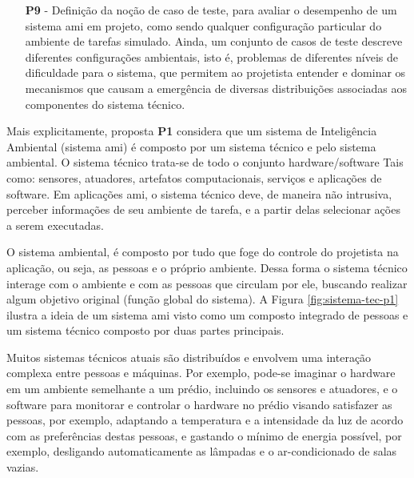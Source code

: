 \begin{itemize}
    \item[\textbf{P9} -] Definição da noção de caso de teste, para avaliar o desempenho de um sistema \acrshort{ami} em projeto, como sendo qualquer configuração particular do ambiente de tarefas simulado. Ainda, um conjunto de casos de teste descreve diferentes configurações ambientais, isto é, problemas de diferentes níveis de dificuldade para o sistema, que permitem ao projetista entender e dominar os mecanismos que causam a emergência de diversas distribuições associadas aos componentes do sistema técnico.
    
\end{itemize}

    Mais explicitamente, proposta \textbf{P1} considera que um sistema de Inteligência Ambiental (sistema \acrshort{ami}) é composto por um sistema técnico e pelo sistema ambiental. O sistema técnico trata-se de todo o conjunto hardware/software Tais como: sensores, atuadores, artefatos computacionais, serviços e aplicações de software. Em aplicações \acrshort{ami}, o sistema técnico deve, de maneira não intrusiva, perceber informações de seu ambiente de tarefa, e a partir delas selecionar ações a serem executadas.    
    
    O sistema ambiental, é composto por tudo que foge do controle do projetista na aplicação, ou seja, as pessoas e o próprio ambiente. Dessa forma o sistema técnico interage com o ambiente e com as pessoas que circulam por ele, buscando realizar algum objetivo original (função global do sistema). A Figura \ref{fig:sistema-tec-p1} ilustra a ideia de um sistema \acrshort{ami} visto como um composto integrado de pessoas e um sistema técnico composto por duas partes principais. 

   
    \begin{figure}[h!]
        \centering
    \end{figure}
    
    Muitos sistemas técnicos atuais são distribuídos e envolvem uma interação complexa entre pessoas e máquinas. Por exemplo, pode-se imaginar o hardware em um ambiente semelhante a um prédio, incluindo os sensores e atuadores, e o software para monitorar e controlar o hardware no prédio visando satisfazer as pessoas, por exemplo, adaptando a temperatura e a intensidade da luz de acordo com as preferências destas pessoas, e gastando o mínimo de energia possível, por exemplo, desligando automaticamente as lâmpadas e o ar-condicionado de salas vazias.
    
